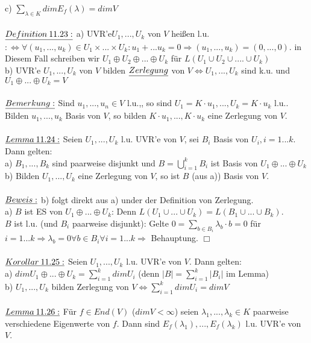 \documentclass[fleqn, a4paper, 11pt]{scrartcl}
\theoremstyle{definition}
\begin{document}
c) $\sum\limits_{\lambda\in K} dim E_f(\lambda)=dim V$\\
\\
$\uline{Definition\:11.23:}$ a) UVR'e$U_1,...,U_k$ von $V$ heißen l.u. $:\Leftrightarrow \forall(u_1,...,u_k)\in U_1\times...\times U_k:u_1+...u_k=0\Rightarrow(u_1,...,u_k)=(0,...,0).$ in Diesem Fall schreiben wir $U_1\oplus U_2\oplus...\oplus U_k$ für $L(U_1\cup U_2\cup....\cup U_k)$\\
b) UVR'e $U_1,...,U_k$ von $V$ bilden $\uline{Zerlegung}$ von $V\Leftrightarrow U_1,...,U_k$ sind k.u. und $U_1\oplus...\oplus U_k=V$\\
\\
$\uline{Bemerkung:}$ Sind $u_1,...,u_n\in V$ l.u.,, so sind $U_1=K\cdot u_1,...,U_k=K\cdot u_k$ l.u.. Bilden $u_1,...,u_k$ Basis von $V$, so bilden $K\cdot u_1,...,K\cdot u_k$ eine Zerlegung von $V$.\\
\\
$\uline{Lemma\:11.24:}$ Seien $U_1,...,U_k$ l.u. UVR'e von $V$, sei $B_i$ Basis von $U_i,i=1...k$. Dann gelten:\\
a) $B_1,...,B_k$ sind paarweise disjunkt und $B=\bigcup\limits_{i=1}^k B_i$ ist Basis von $U_1\oplus...\oplus U_k$\\
b) Bilden $U_1,...,U_k$ eine Zerlegung von $V$, so ist $B$ (aus a)) Basis von $V$.\\
\\
$\uline{Beweis:}$ b) folgt direkt aus a) under der Definition von Zerlegung.\\
a) $B$ ist ES von $U_1\oplus...\oplus U_k$: Denn $L(U_1\cup...\cup U_k)=L(B_1\cup...\cup B_k)$.\\
$B$ ist l.u. (und $B_i$ paarweise disjunkt): Gelte $0=\sum\limits_{b\in B_i}\lambda_b\cdot b=0$ für $i=1...k\Rightarrow \lambda_b=0\forall b\in B_i \forall i=1...k\Rightarrow$ Behauptung. \hfill $\Box$\\
\\
$\uline{Korollar\:11.25:}$ Seien $U_1,...,U_k$ l.u. UVR'e von $V$. Dann gelten:\\
a) $dim U_1\oplus...\oplus U_k=\sum\limits_{i=1}^k dim U_i$ (denn $|B|=\sum\limits_{i=1}^k |B_i|$ im Lemma)\\
b) $U_1,...,U_k$ bilden Zerlegung von $V\Leftrightarrow\sum\limits_{i=1}^k dim U_i=dim V$\\
\\
$\uline{Lemma\:11.26:}$ Für $f\in End(V)$ ($dim V<\infty$) seien $\lambda_1,...,\lambda_k\in K$ paarweise verschiedene Eigenwerte von $f$. Dann sind $E_f(\lambda_1),...,E_f(\lambda_k)$ l.u. UVR'e von $V$.\\
\end{document}
